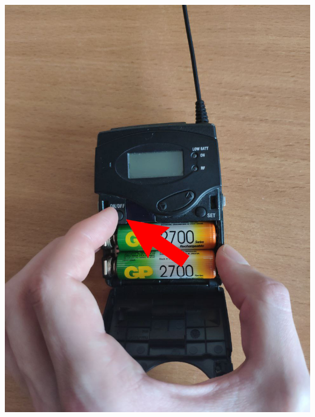 \begin{enumerate}
\begin{enumerate}
\begin{minipage}[c]{0.29\textwidth}
                  \includegraphics[width=\textwidth]{Images/PortableCamera/micro/step10.2-2-micro-off.jpg}
                \end{minipage}
                \hfill
                \begin{minipage}[c]{0.29\textwidth}

\end{minipage}
\end{enumerate}
\end{enumerate}
